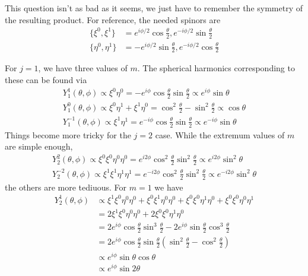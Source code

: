 \documentclass[../road-to-reality.tex]{subfiles}
\begin{document}
\begin{questions}
\begin{solution}
	This question isn't as bad as it seems, we just have to remember the symmetry of the resulting product. For reference, the needed spinors are
	\begin{align*}
		\{\xi^0, \xi^1\} &= e^{i\phi/2}\cos\tfrac{\theta}{2}, e^{-i\phi/2}\sin\tfrac{\theta}{2} \\
		\{\eta^0, \eta^1\} &= -e^{i\phi/2}\sin\tfrac{\theta}{2}, e^{-i\phi/2}\cos\tfrac{\theta}{2}
	\end{align*}
	
	For $j = 1$, we have three values of $m$. The spherical harmonics corresponding to these can be found via
	\begin{gather*}
		Y_{1}^{1}(\theta, \phi) \propto \xi^0\eta^0 = -e^{i\phi}\cos\tfrac{\theta}{2}\sin\tfrac{\theta}{2} \propto e^{i\phi}\sin\theta \\
		Y_1^0(\theta, \phi) \propto \xi^0\eta^1 + \xi^1\eta^0 = \cos^2\tfrac{\theta}{2} - \sin^2\tfrac{\theta}{2} \propto \cos\theta \\
		Y_1^{-1}(\theta, \phi) \propto \xi^1\eta^1 = e^{-i\phi}\cos\tfrac{\theta}{2}\sin\tfrac{\theta}{2} \propto e^{-i\phi}\sin\theta 
	\end{gather*}
	Things become more tricky for the $j = 2$ case. While the extremum values of $m$ are simple enough,
	\begin{gather*}
	Y_{2}^{2}(\theta, \phi) \propto \xi^0\xi^0\eta^0\eta^0 = e^{i2\phi}\cos^2\tfrac{\theta}{2}\sin^2\tfrac{\theta}{2} \propto e^{i2\phi}\sin^2\theta \\
	Y_{2}^{-2}(\theta, \phi) \propto \xi^1\xi^1\eta^1\eta^1 = e^{-i2\phi}\cos^2\tfrac{\theta}{2}\sin^2\tfrac{\theta}{2} \propto e^{-i2\phi}\sin^2\theta
	\end{gather*}
	the others are more tediuous. For $m = 1$ we have
	\begin{align*}
		Y_{2}^{1}(\theta, \phi) &\propto \xi^1\xi^0\eta^0\eta^0 + \xi^0\xi^1\eta^0\eta^0 + \xi^0\xi^0\eta^1\eta^0 + \xi^0\xi^0\eta^0\eta^1 \\
		&= 2\xi^1\xi^0\eta^0\eta^0 + 2\xi^0\xi^0\eta^1\eta^0 \\
		&=  2e^{i\phi}\cos\tfrac{\theta}{2}\sin^3\tfrac{\theta}{2} - 2e^{i\phi}\sin\tfrac{\theta}{2}\cos^3\tfrac{\theta}{2}\\
		&= 2e^{i\phi}\cos\tfrac{\theta}{2}\sin\tfrac{\theta}{2}(\sin^2\tfrac{\theta}{2} - \cos^2\tfrac{\theta}{2}) \\
		&\propto e^{i\phi}\sin\theta\cos\theta \\
		&\propto e^{i\phi}\sin2\theta \\

\end{align*}
\end{solution}
\end{questions}
\end{document}
